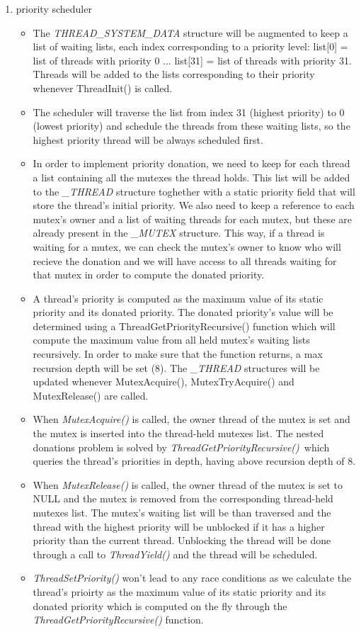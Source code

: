 \begin{enumerate}
    \item priority scheduler
        \begin{itemize}
			\item The \textit {THREAD_SYSTEM_DATA} structure will be augmented to keep a list of waiting lists, each index corresponding to a priority level:
				  list[0] = list of threads with priority 0 ... list[31] = list of threads with priority 31. Threads will be added to the lists corresponding
				  to their priority whenever ThreadInit() is called. 
			\item The scheduler will traverse the list from index 31 (highest priority) to 0 (lowest priority) and schedule the threads from these 
			      waiting lists, so the highest priority thread will be always scheduled first.
			\item In order to implement priority donation, we need to keep for each thread a list containing all the mutexes the thread holds. This list
				  will be added to the \textit{_THREAD} structure toghether with a static priority field that will store the thread's initial priority.
				  We also need to keep a reference to each mutex's owner and a list of waiting threads for each mutex, but these are
				  already present in the \textit{_MUTEX} structure. This way, if a thread is waiting for a mutex, we can check the mutex's owner
				  to know who will recieve the donation and we will have access to all threads waiting for that mutex in order to compute the donated priority.
			\item A thread's priority is computed as the maximum value of its static priority and its donated priority. 
				  The donated priority's value will be determined using a ThreadGetPriorityRecursive() function which will compute the maximum value 
				  from all held mutex's waiting lists recursively. In order to make sure that the function returns, a max recursion depth will be set (8).
				  The \textit{_THREAD} structures will be updated whenever MutexAcquire(), MutexTryAcquire() and MutexRelease() are called.
		   \item  When \textit{MutexAcquire()} is called, the owner thread of the mutex is set and the mutex is inserted into the thread-held mutexes list.
				  The nested donations problem is solved by \textit{ThreadGetPriorityRecursive()}\ which queries the thread's priorities in depth, having above
				  recursion depth of 8.
		   \item When \textit{MutexRelease()} is called, the owner thread of the mutex is set to NULL and the mutex is removed from the corresponding thread-held mutexes list.
				 The mutex's waiting list will be than traversed and the thread with the highest priority will be unblocked if it has a higher priority than the current thread.
				 Unblocking the thread will be done through a call to \textit{ThreadYield()} and the thread will be scheduled.
		   \item \textit{ThreadSetPriority()} won't lead to any race conditions as we calculate the thread's prioirty as the maximum value of its 
				 static priority and its donated priority which is computed on the fly through the \textit{ThreadGetPriorityRecursive()} function.	
        \end{itemize}
    

\end{enumerate}
